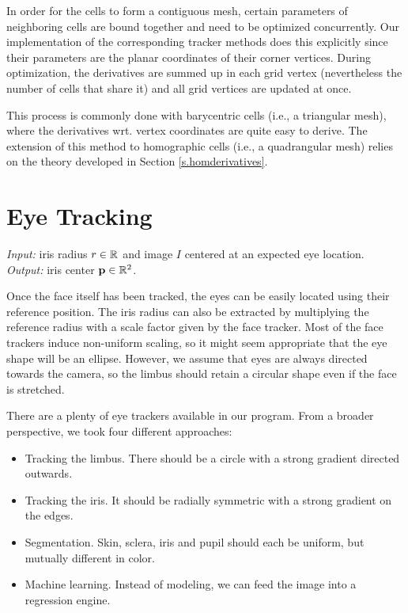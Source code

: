 In order for the cells to form a contiguous mesh, certain parameters of neighboring cells are bound together and need to be optimized concurrently.
Our implementation of the corresponding tracker methods does this explicitly since their parameters are the planar coordinates of their corner vertices.
During optimization, the derivatives are summed up in each grid vertex (nevertheless the number of cells that share it) and all grid vertices are updated at once.

This process is commonly done with barycentric cells (i.e., a triangular mesh), where the derivatives wrt. vertex coordinates are quite easy to derive.
The extension of this method to homographic cells (i.e., a quadrangular mesh) relies on the theory developed in Section \ref{s.homderivatives}.

\section{Eye Tracking}

\textit{Input:} iris radius $r \in \mathbb{R}$ and image $I$ centered at an expected eye location.\\
\textit{Output:} iris center $\mathbf{p} \in \mathbb{R}^2$.\\


Once the face itself has been tracked, the eyes can be easily located using their reference position.
The iris radius can also be extracted by multiplying the reference radius with a scale factor given by the face tracker.
Most of the face trackers induce non-uniform scaling, so it might seem appropriate that the eye shape will be an ellipse.
However, we assume that eyes are always directed towards the camera, so the limbus should retain a circular shape even if the face is stretched.

There are a plenty of eye trackers available in our program.
From a broader perspective, we took four different approaches:
\begin{itemize}
\item Tracking the limbus. There should be a circle with a strong gradient directed outwards.
\item Tracking the iris. It should be radially symmetric with a strong gradient on the edges.
\item Segmentation. Skin, sclera, iris and pupil should each be uniform, but mutually different in color.
\item Machine learning. Instead of modeling, we can feed the image into a regression engine.
\end{itemize}

